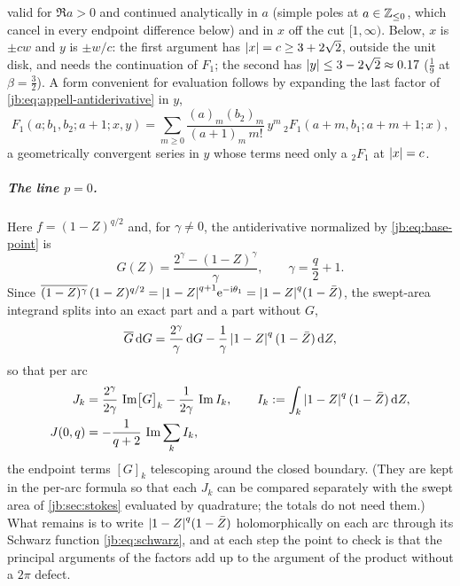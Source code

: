 valid for $\Re a > 0$ and continued analytically in $a$ (simple poles at $a \in \mathbb{Z}_{\le 0}$, which cancel in every endpoint
difference below) and in $x$ off the cut $[1, \infty)$.
Below, $x$ is $\pm c w$ and $y$ is $\pm w / c$: the first argument has ${|x|} = c \ge 3 + 2\sqrt2$, outside
the unit disk, and needs the continuation of $F_1$; the second has ${|y|} \le 3 - 2\sqrt2 \approx 0.17$
($\tfrac19$ at $\beta = \tfrac32$).
A form convenient for evaluation follows by expanding the last factor of
\eqref{jb:eq:appell-antiderivative} in $y$,
\begin{equation}
  \label{jb:eq:appell-single-sum}
  F_1(a; b_1, b_2; a + 1; x, y)
    = \sum_{m \ge 0} \frac{(a)_m (b_2)_m}{(a + 1)_m \, m!} \, y^m \,
      {}_2F_1(a + m, b_1; a + m + 1; x),
\end{equation}
a geometrically convergent series in $y$ whose terms need only a ${}_2F_1$ at ${|x|} = c$.

\subparagraph{The line $p = 0$.}
Here $f = (1 - Z)^{q/2}$ and, for $\gamma \ne 0$, the antiderivative normalized by
\eqref{jb:eq:base-point} is
\begin{equation}
  \label{jb:eq:G-p-zero}
  G(Z)
    = \frac{2^{\gamma} - (1 - Z)^{\gamma}}{\gamma},
  \qquad
  \gamma
    = \frac{q}{2} + 1 .
\end{equation}
Since $\overline{(1 - Z)^{\gamma}} \, (1 - Z)^{q/2} = {|1 - Z|}^{q + 1} \mathrm{e}^{-\mathrm{i} \theta_1}
= {|1 - Z|}^{q} (1 - \bar Z)$, the swept-area integrand splits into an exact part and a part
without $G$,
\begin{equation}
  \label{jb:eq:reduction-p-zero}
  \overline{G} \, \mathrm{d} G
    = \frac{2^{\gamma}}{\gamma} \, \mathrm{d} G
      - \frac{1}{\gamma} \, {|1 - Z|}^{q} \, (1 - \bar Z) \, \mathrm{d} Z ,
\end{equation}
so that per arc
\begin{equation}
  \label{jb:eq:per-arc-p-zero}
  \begin{aligned}
    J_k
      &
      = \frac{2^{\gamma}}{2 \gamma} \, \operatorname{Im} \bigl[ G \bigr]_k
        - \frac{1}{2 \gamma} \, \operatorname{Im} I_k,
    \qquad
    I_k
      := \int_k {|1 - Z|}^{q} \, (1 - \bar Z) \, \mathrm{d} Z,
    \\
    J(0, q)
      &
      = - \frac{1}{q + 2} \, \operatorname{Im} \sum_k I_k,
  \end{aligned}
\end{equation}
the endpoint terms $[G]_k$ telescoping around the closed boundary.
(They are kept in the per-arc formula so that each $J_k$ can be compared separately with the swept
area of \cref{jb:sec:stokes} evaluated by quadrature; the totals do not need them.)
What remains is to write ${|1 - Z|}^{q} (1 - \bar Z)$ holomorphically on each arc through its
Schwarz function \eqref{jb:eq:schwarz}, and at each step the point to check is that the principal
arguments of the factors add up to the argument of the product without a $2\pi$ defect.


